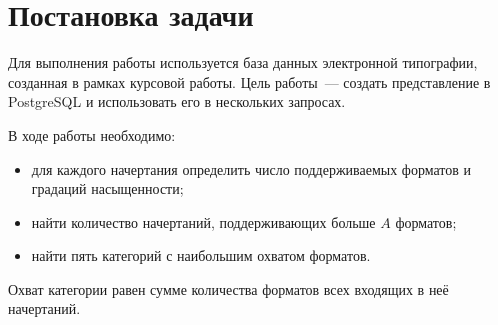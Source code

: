 \section{Постановка задачи}

Для выполнения работы используется база данных электронной типографии,
созданная в рамках курсовой работы. Цель работы~--- создать представление в
PostgreSQL и использовать его в нескольких запросах.

В ходе работы необходимо:

\begin{itemize}
    \item для каждого начертания определить число поддерживаемых форматов и
    градаций насыщенности;
    \item найти количество начертаний, поддерживающих больше $A$ форматов;
    \item найти пять категорий с наибольшим охватом форматов.
\end{itemize}

Охват категории равен сумме количества форматов всех входящих в неё
начертаний.
